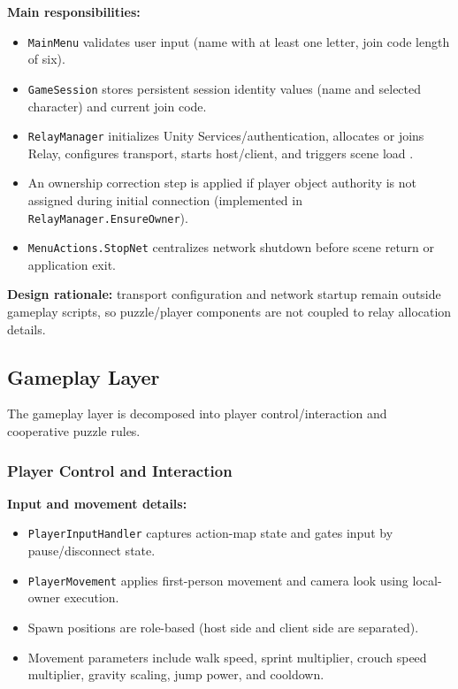 \textbf{Main responsibilities:}
\begin{itemize}
\item \texttt{MainMenu} validates user input (name with at least one letter, join code length of six).
\item \texttt{GameSession} stores persistent session identity values (name and selected character) and current join code.
\item \texttt{RelayManager} initializes Unity Services/authentication, allocates or joins Relay, configures transport, starts host/client, and triggers scene load \cite{unity_authentication_docs,unity_relay_docs}.
\item An ownership correction step is applied if player object authority is not assigned during initial connection (implemented in \texttt{RelayManager.EnsureOwner}).
\item \texttt{MenuActions.StopNet} centralizes network shutdown before scene return or application exit.
\end{itemize}

\textbf{Design rationale:} transport configuration and network startup remain outside gameplay scripts, so puzzle/player components are not coupled to relay allocation details.

\subsection*{Gameplay Layer}
The gameplay layer is decomposed into player control/interaction and cooperative puzzle rules.

\newpage

\subsubsection*{Player Control and Interaction}
\textbf{Input and movement details:}
\begin{itemize}
\item \texttt{PlayerInputHandler} captures action-map state and gates input by pause/disconnect state.
\item \texttt{PlayerMovement} applies first-person movement and camera look using local-owner execution.
\item Spawn positions are role-based (host side and client side are separated).
\item Movement parameters include walk speed, sprint multiplier, crouch speed multiplier, gravity scaling, jump power, and cooldown.
\end{itemize}

